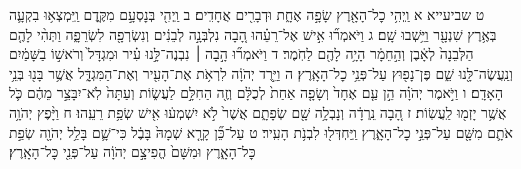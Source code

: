 \documentclass[twoside, openany, parskip=half, 11pt]{book}
\begin{document}
ט שביעייא א וַֽיְהִ֥י כׇל־הָאָ֖רֶץ שָׂפָ֣ה אֶחָ֑ת וּדְבָרִ֖ים אֲחָדִֽים׃ ב וַֽיְהִ֖י בְּנׇסְעָ֣ם מִקֶּ֑דֶם וַֽיִּמְצְא֥וּ בִקְעָ֛ה בְּאֶ֥רֶץ שִׁנְעָ֖ר וַיֵּ֥שְׁבוּ שָֽׁם׃ ג וַיֹּאמְר֞וּ אִ֣ישׁ אֶל־רֵעֵ֗הוּ הָ֚בָה נִלְבְּנָ֣ה לְבֵנִ֔ים וְנִשְׂרְפָ֖ה לִשְׂרֵפָ֑ה וַתְּהִ֨י לָהֶ֤ם הַלְּבֵנָה֙ לְאָ֔בֶן וְהַ֣חֵמָ֔ר הָיָ֥ה לָהֶ֖ם לַחֹֽמֶר׃ ד וַיֹּאמְר֞וּ הָ֣בָה ׀ נִבְנֶה־לָּ֣נוּ עִ֗יר וּמִגְדָּל֙ וְרֹאשׁ֣וֹ בַשָּׁמַ֔יִם וְנַֽעֲשֶׂה־לָּ֖נוּ שֵׁ֑ם פֶּן־נָפ֖וּץ עַל־פְּנֵ֥י כׇל־הָאָֽרֶץ׃ ה וַיֵּ֣רֶד יְהֹוָ֔ה לִרְאֹ֥ת אֶת־הָעִ֖יר וְאֶת־הַמִּגְדָּ֑ל אֲשֶׁ֥ר בָּנ֖וּ בְּנֵ֥י הָאָדָֽם׃ ו וַיֹּ֣אמֶר יְהֹוָ֗ה הֵ֣ן עַ֤ם אֶחָד֙ וְשָׂפָ֤ה אַחַת֙ לְכֻלָּ֔ם וְזֶ֖ה הַחִלָּ֣ם לַעֲשׂ֑וֹת וְעַתָּה֙ לֹֽא־יִבָּצֵ֣ר מֵהֶ֔ם כֹּ֛ל אֲשֶׁ֥ר יָזְמ֖וּ לַֽעֲשֽׂוֹת׃ ז הָ֚בָה נֵֽרְדָ֔ה וְנָבְלָ֥ה שָׁ֖ם שְׂפָתָ֑ם אֲשֶׁר֙ לֹ֣א יִשְׁמְע֔וּ אִ֖ישׁ שְׂפַ֥ת רֵעֵֽהוּ׃ ח וַיָּ֨פֶץ יְהֹוָ֥ה אֹתָ֛ם מִשָּׁ֖ם עַל־פְּנֵ֣י כׇל־הָאָ֑רֶץ וַֽיַּחְדְּל֖וּ לִבְנֹ֥ת הָעִֽיר׃ ט עַל־כֵּ֞ן קָרָ֤א שְׁמָהּ֙ בָּבֶ֔ל כִּי־שָׁ֛ם בָּלַ֥ל יְהֹוָ֖ה שְׂפַ֣ת כׇּל־הָאָ֑רֶץ וּמִשָּׁם֙ הֱפִיצָ֣ם יְהֹוָ֔ה עַל־פְּנֵ֖י כׇּל־הָאָֽרֶץ׃
\end{document}
